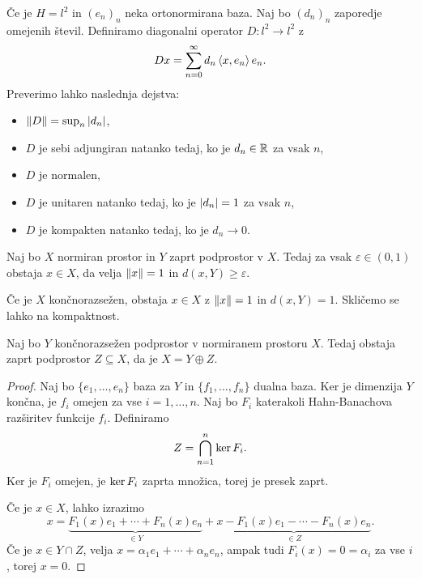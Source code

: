 
\begin{primer}
  Če je $H = l^2$ in $(e_n)_n$ neka ortonormirana baza.
  Naj bo $(d_n)_n$ zaporedje omejenih števil.
  Definiramo diagonalni operator $D: l^2 \to l^2$ z
  \[
	Dx = \sum_{n=0}^\infty d_n \left< x, e_n \right> e_n.
  \]
  Preverimo lahko naslednja dejstva:
  \begin{itemize}
  \item $\left\lVert D\right\rVert = \sup_n \left| d_n \right|$,
  \item $D$ je sebi adjungiran natanko tedaj, ko je $d_n \in \mathbb{R}$ za vsak $n$,
  \item $D$ je normalen,
  \item $D$ je unitaren natanko tedaj, ko je $\left| d_n \right| = 1$ za vsak $n$,
  \item $D$ je kompakten natanko tedaj, ko je $d_n \to 0$.
  \end{itemize}
\end{primer}

\begin{lema}
  Naj bo $X$ normiran prostor in $Y$ zaprt podprostor v $X$.
  Tedaj za vsak $\varepsilon \in (0,1)$ obstaja $x \in X$, da velja $\left\lVert x\right\rVert =
  1$ in $d(x,Y) \ge \varepsilon$.
\end{lema}

\begin{opomba}
  Če je $X$ končnorazsežen, obstaja $x \in X$ z $\left\lVert x\right\rVert = 1$ in $d(x,Y) = 1$.
  Skličemo se lahko na kompaktnost.
\end{opomba}

\begin{trditev}
  Naj bo $Y$ končnorazsežen podprostor v normiranem prostoru $X$.
  Tedaj obstaja zaprt podprostor $Z \subseteq X$, da je $X = Y \oplus Z$.
\end{trditev}

\begin{proof}
  Naj bo $\{e_1, \ldots, e_n\}$ baza za $Y$ in $\{f_1, \ldots, f_n\}$ dualna
  baza.
  Ker je dimenzija $Y$ končna, je $f_i$ omejen za vse $i=1, \ldots, n$.
  Naj bo $F_i$ katerakoli Hahn-Banachova razširitev funkcije $f_i$.
  Definiramo
  \[
	Z = \bigcap_{n=1}^n \operatorname{ker} F_i.
  \]
  Ker je $F_i$ omejen, je $\operatorname{ker} F_i$ zaprta množica, torej je presek zaprt.

  Če je $x \in X$, lahko izrazimo
  \[
	x = \underbrace{ F_1(x) e_1 + \cdots + F_n(x) e_n }_{\in Y}
	+ \underbrace{ x - F_1(x) e_1 - \cdots - F_n(x) e_n }_{\in Z}.
  \]
  Če je $x \in Y \cap Z$, velja $x = \alpha_1 e_1 + \cdots + \alpha_n e_n$,
  ampak tudi $F_i(x) = 0 = \alpha_i$ za vse $i$, torej $x = 0$.
\end{proof}

